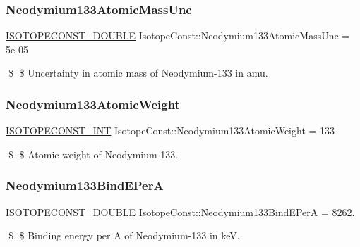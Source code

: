 \subsubsection{\texorpdfstring{Neodymium133\+Atomic\+Mass\+Unc}{Neodymium133AtomicMassUnc}}
{\footnotesize\ttfamily \mbox{\hyperlink{group___isotope_const-_macros_ga8f45a7272ce02c0b4c65c44636ed719a}{I\+S\+O\+T\+O\+P\+E\+C\+O\+N\+S\+T\+\_\+\+D\+O\+U\+B\+LE}} Isotope\+Const\+::\+Neodymium133\+Atomic\+Mass\+Unc = 5e-\/05}

\$ \$ Uncertainty in atomic mass of Neodymium-\/133 in amu. \mbox{\label{group___isotope_const-_neodymium-_nd133_gaf42261be2f02e26a9d1f5be04c146f87}} 
\subsubsection{\texorpdfstring{Neodymium133\+Atomic\+Weight}{Neodymium133AtomicWeight}}
{\footnotesize\ttfamily \mbox{\hyperlink{group___isotope_const-_macros_ga5f18360b3e99483a35c32d789e62621c}{I\+S\+O\+T\+O\+P\+E\+C\+O\+N\+S\+T\+\_\+\+I\+NT}} Isotope\+Const\+::\+Neodymium133\+Atomic\+Weight = 133}

\$ \$ Atomic weight of Neodymium-\/133. \mbox{\label{group___isotope_const-_neodymium-_nd133_ga958c7ae0b301579b601f07a90d3f0ebb}} 
\subsubsection{\texorpdfstring{Neodymium133\+Bind\+E\+PerA}{Neodymium133BindEPerA}}
{\footnotesize\ttfamily \mbox{\hyperlink{group___isotope_const-_macros_ga8f45a7272ce02c0b4c65c44636ed719a}{I\+S\+O\+T\+O\+P\+E\+C\+O\+N\+S\+T\+\_\+\+D\+O\+U\+B\+LE}} Isotope\+Const\+::\+Neodymium133\+Bind\+E\+PerA = 8262.}

\$ \$ Binding energy per A of Neodymium-\/133 in keV. \mbox{\label{group___isotope_const-_neodymium-_nd133_gace3951e01396feaf2a94ae6bb5846625}} 
